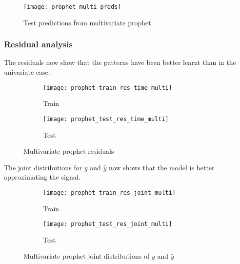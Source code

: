 \begin{figure}[H]
	\centering
	\texttt{[image: prophet\_multi\_preds]}
	\caption{Test predictions from multivariate prophet}
	\label{fig:prophet_multi_preds}
\end{figure}




\subsubsection*{Residual analysis}

The residuals now show that the patterns have been better learnt than in the univariate case.

\begin{figure}[hptb]
	\begin{subfigure}{.47\textwidth}
		\texttt{[image: prophet\_train\_res\_time\_multi]}
		\caption{Train}
		\label{fig:prophet_train_res_time_multi}
	\end{subfigure}%
	\hfill
	\begin{subfigure}{.47\textwidth}
		\texttt{[image: prophet\_test\_res\_time\_multi]}
		\caption{Test}
		\label{fig:prophet_test_res_time_multi}
	\end{subfigure}
	\caption{Multivariate prophet residuals}
	\label{fig:prophet_res_time_multi}
\end{figure}

The joint distributions for $y$ and $\hat{y}$ now shows that the model is better approximating the signal. 

\begin{figure}[hptb]
	\begin{subfigure}{.47\textwidth}
		\texttt{[image: prophet\_train\_res\_joint\_multi]}
		\caption{Train}
		\label{fig:prophet_train_res_joint_multi}
	\end{subfigure}%
	\hfill
	\begin{subfigure}{.47\textwidth}
		\texttt{[image: prophet\_test\_res\_joint\_multi]}
		\caption{Test}
		\label{fig:prophet_test_res_joint_multi}
	\end{subfigure}
	\caption{Multivariate prophet joint distributions of $y$ and $\hat{y}$}
	\label{fig:prophet_res_joint_multi}
\end{figure}

